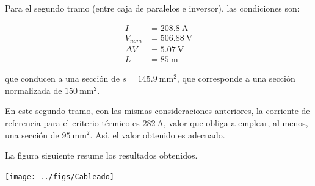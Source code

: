 Para el segundo tramo (entre caja de paralelos e inversor), las
condiciones son:

\begin{align*}
  I & =\SI{208.8}{\ampere}\\
  V_{nom} & = \SI{506.88}{\volt}\\
  \Delta V & = \SI{5.07}{\volt}\\
  L & = \SI{85}{\meter}
\end{align*}

que conducen a una sección de $s=\SI{145.9}{\milli\meter\squared}$,
que corresponde a una sección normalizada de
$\SI{150}{\milli\meter\squared}$.

En este segundo tramo, con las mismas consideraciones anteriores, 
la corriente de referencia para el criterio
térmico es $\SI{282}{\ampere}$, valor que obliga a emplear, al menos,
una sección de $\SI{95}{\milli\meter\squared}$. Así, el valor obtenido
es adecuado.

La figura siguiente resume los resultados obtenidos.

\begin{center}
\texttt{[image: ../figs/Cableado]}  
\end{center}


